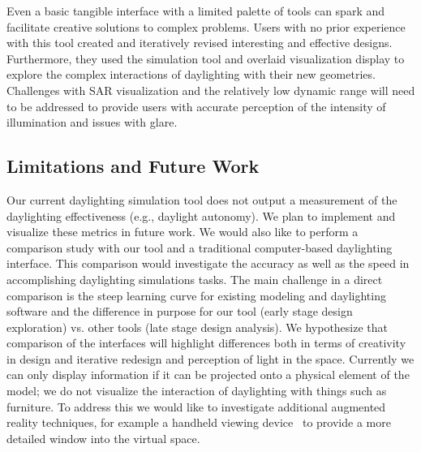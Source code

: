 Even a basic tangible interface with a limited palette of tools can
spark and facilitate creative solutions to complex problems.  Users
with no prior experience with this tool created and iteratively
revised interesting and effective designs.  Furthermore, they used the
simulation tool and overlaid visualization display to explore the
complex interactions of daylighting with their new geometries.
Challenges with SAR visualization and the relatively low dynamic range
will need to be addressed to provide users with accurate perception of
the intensity of illumination and issues with glare.


%










\subsection{Limitations and Future Work}

Our current daylighting simulation tool does not output a measurement
of the daylighting effectiveness (e.g., daylight autonomy).
We plan to implement and visualize these metrics in future work.  We
would also like to perform a comparison study with our tool and a
traditional computer-based daylighting interface.  This comparison
would investigate the accuracy as well as the speed in accomplishing
daylighting simulations tasks.  The main challenge in a direct
comparison is the steep learning curve for existing modeling and
daylighting software and the difference in purpose for our tool (early
stage design exploration) vs. other tools (late stage design
analysis).  We hypothesize that comparison of the interfaces will
highlight differences both in terms of creativity in design and
iterative redesign and perception of light in the space.
%
Currently we can only display information if it can be projected onto
a physical element of the model; we do not visualize the interaction
of daylighting with things such as furniture.
%
To address this we would like to investigate additional augmented
reality techniques, for example a handheld viewing
device~\cite{Ishii97tangiblebits,642613,1517704} to provide a more
detailed window into the virtual space.

